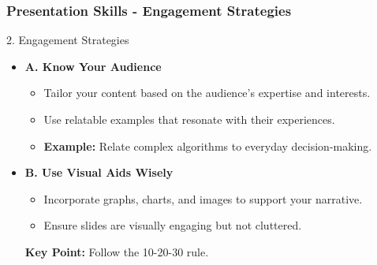 \documentclass[aspectratio=169]{beamer}
\begin{document}
\begin{frame}[fragile]
    \frametitle{Presentation Skills - Engagement Strategies}
    \begin{block}{2. Engagement Strategies}
        \begin{itemize}
            \item \textbf{A. Know Your Audience}
            \begin{itemize}
                \item Tailor your content based on the audience’s expertise and interests.
                \item Use relatable examples that resonate with their experiences.
                \item \textbf{Example:} Relate complex algorithms to everyday decision-making.
            \end{itemize}

            \item \textbf{B. Use Visual Aids Wisely}
            \begin{itemize}
                \item Incorporate graphs, charts, and images to support your narrative.
                \item Ensure slides are visually engaging but not cluttered.
            \end{itemize}
            \textbf{Key Point:} Follow the 10-20-30 rule.
        \end{itemize}
    \end{block}
\end{frame}
\end{document}
